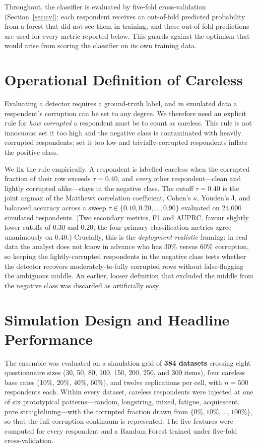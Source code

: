 Throughout, the classifier is evaluated by five-fold cross-validation
(Section~\ref{sec:cv}): each respondent receives an out-of-fold predicted probability
from a forest that did not see them in training, and these out-of-fold
predictions are used for every metric reported below. This guards against the
optimism that would arise from scoring the classifier on its own training data.

\section{Operational Definition of Careless}

Evaluating a detector requires a ground-truth label, and in simulated data a
respondent's corruption can be set to any degree. We therefore need an explicit
rule for \emph{how corrupted} a respondent must be to count as careless. This
rule is not innocuous: set it too high and the negative class is contaminated
with heavily corrupted respondents; set it too low and trivially-corrupted
respondents inflate the positive class.

We fix the rule empirically. A respondent is labelled careless when the
corrupted fraction of their row exceeds $\tau = 0.40$, and \emph{every} other
respondent---clean and lightly corrupted alike---stays in the negative class.
The cutoff $\tau = 0.40$ is the joint argmax of the Matthews correlation
coefficient, Cohen's $\kappa$, Youden's J, and balanced accuracy across a sweep
$\tau \in \{0.10, 0.20, \dots, 0.90\}$ evaluated on 24{,}000 simulated
respondents. (Two secondary metrics, F1 and AUPRC, favour slightly lower cutoffs
of $0.30$ and $0.20$; the four primary classification metrics agree unanimously
on $0.40$.) Crucially, this is the \emph{deployment-realistic} framing: in real
data the analyst does not know in advance who has 30\% versus 60\% corruption, so
keeping the lightly-corrupted respondents in the negative class tests whether the
detector recovers moderately-to-fully corrupted rows without false-flagging the
ambiguous middle. An earlier, looser definition that excluded the middle from
the negative class was discarded as artificially easy.

\section{Simulation Design and Headline Performance}

The ensemble was evaluated on a simulation grid of \textbf{384 datasets}
crossing eight questionnaire sizes (30, 50, 80, 100, 150, 200, 250, and 300
items), four careless base rates (10\%, 20\%, 40\%, 60\%), and twelve
replications per cell, with $n = 500$ respondents each. Within every dataset,
careless respondents were injected at one of six prototypical patterns---random,
longstring, mixed, fatigue, acquiescent, pure straightlining---with the
corrupted fraction drawn from $\{0\%, 10\%, \dots, 100\%\}$, so that the full
corruption continuum is represented. The five features were computed for every
respondent and a Random Forest trained under five-fold cross-validation.

